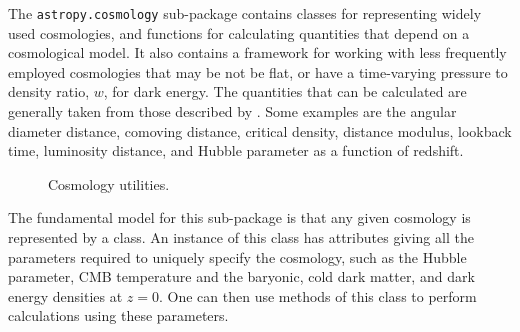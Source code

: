 \documentclass[traditabstract]{aa}
\begin{document}
\label{sec:cosmology}


The \texttt{astropy.cosmology} sub-package contains classes for
representing widely used cosmologies, and functions for calculating
quantities that depend on a cosmological model. It also contains a
framework for working with less frequently employed cosmologies that
may be not be flat, or have a time-varying pressure to density ratio,
$w$, for dark energy. The quantities that can be calculated are
generally taken from those described by \citet{Hogg99}. Some examples
are the angular diameter distance, comoving distance, critical
density, distance modulus, lookback time, luminosity distance, and
Hubble parameter as a function of redshift.

\begin{figure}
\caption{Cosmology utilities.\label{code:cosmology}}
\end{figure}

The fundamental model for this sub-package is that any given cosmology
is represented by a class. An instance of this class has attributes
giving all the parameters required to uniquely specify the cosmology,
such as the Hubble parameter, CMB temperature and the baryonic, cold
dark matter, and dark energy densities at $z=0$. One can then use
methods of this class to perform calculations using these parameters.
\end{document}
